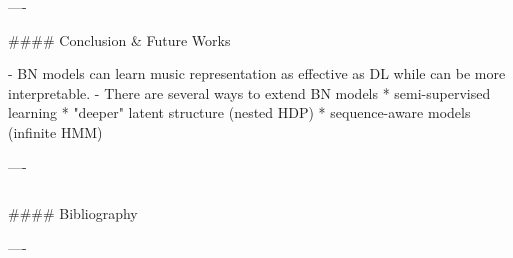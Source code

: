 \documentclass{beamer}
\begin{document}
\begin{frame}[fragile]
\begin{columns}[T]
\begin{column}{.46\textwidth}
\begin{markdown}
----

#### Conclusion \& Future Works

- BN models can learn music representation as effective as DL while can be more interpretable.
- There are several ways to extend BN models
    * semi-supervised learning
    * "deeper" latent structure (nested HDP)
    * sequence-aware models (infinite HMM)

----


\end{markdown}
\end{column}
\end{columns}

\begin{markdown}

#### Bibliography




----

\end{markdown}

\end{frame}
\end{document}
